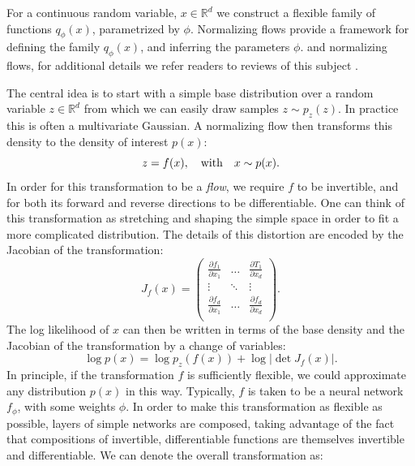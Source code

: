 \documentclass[fleqn,usenatbib]{mnras}
\begin{document}
For a continuous random variable, $x\in \mathbb R^d$ we construct a flexible family of functions $q_\phi(x)$, parametrized by $\phi$. Normalizing flows provide a framework for defining the family $q_\phi(x)$, and inferring the parameters $\phi$. and  normalizing flows, for additional details we refer readers to reviews of this subject \citep{kobyzev/etal:2019, papamakarios/etal:2019}.

The central idea is to start with a simple base distribution over a random variable $z\in\mathbb R^d$ from which we can easily draw samples $z \sim p_z(z)$. In practice this is often a multivariate Gaussian. A normalizing flow then transforms this density to the density of interest $p(x)$:
\begin{equation}
    z = f(x), \quad {\rm with} \quad x \sim p(x). 
\end{equation}
In order for this transformation to be a \emph{flow}, we require $f$ to be invertible, and for both its forward and reverse directions to be differentiable. One can think of this transformation as stretching and shaping the simple space in order to fit a more complicated distribution. The details of this distortion are encoded by the Jacobian of the transformation:
\begin{equation}
J_f(x) = \begin{pmatrix}
    \frac{\partial f_1}{\partial x_1} & \dots & \frac{\partial T_1}{\partial x_d} \\
    \vdots & \ddots & \vdots \\
    \frac{\partial f_d}{\partial x_1} & \dots & \frac{\partial f_d}{\partial x_d} \\
\end{pmatrix}.
\end{equation}
The log likelihood of $x$ can then be written in terms of the base density and the Jacobian of the transformation by a change of variables:
\begin{equation}
\label{eq:log_prob}
    \log p(x) = \log p_z(f(x)) + \log | \det J_f(x) |.
\end{equation}
In principle, if the transformation $f$ is sufficiently flexible, we could approximate any distribution $p(x)$ in this way. Typically, $f$ is taken to be a neural network $f_\phi$, with some weights $\phi$. In order to make this transformation as flexible as possible, layers of simple networks are composed, taking advantage of the fact that compositions of invertible, differentiable functions are themselves invertible and differentiable. We can denote the overall transformation as:
\end{document}
